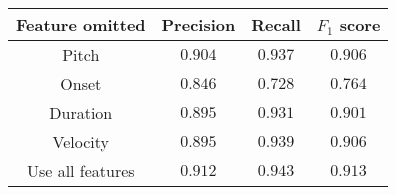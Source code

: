 \begin{tabular}{cccc}
    \textbf{Feature omitted} & Precision & Recall  & $F_1$ score   \\\hline
    Pitch                    & $0.904$   & $0.937$ & $0.906$       \\
    Onset                    & $0.846$   & $0.728$ & $0.764$       \\
    Duration                 & $0.895$   & $0.931$ & $0.901$       \\
    Velocity                 & $0.895$   & $0.939$ & $0.906$       \\
    Use all features         & $0.912$   & $0.943$ & $\mathbf{0.913}$ \\
\end{tabular}
